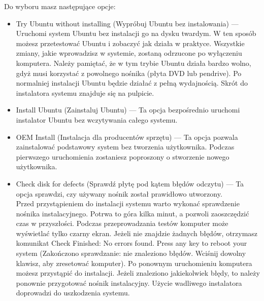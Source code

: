 \noindent Do wyboru masz następujące opcje:
\begin{itemize}
\item \textcolor{ubuntu_orange}{Try Ubuntu without installing (Wypróbuj Ubuntu bez instalowania)} --- Uruchomi system Ubuntu bez instalacji go na dysku twardym. W ten sposób możesz przetestować Ubuntu i zobaczyć jak działa w praktyce. Wszystkie zmiany, jakie wprowadzisz w systemie, zostaną odrzucone po wyłączeniu komputera. Należy pamiętać, że w tym trybie Ubuntu działa bardzo wolno, gdyż musi korzystać z powolnego nośnika (płyta DVD lub pendrive). Po normalniej instalacji Ubuntu będzie działać z pełną wydajnością. Skrót do instalatora systemu znajduje się na pulpicie.
\item \textcolor{ubuntu_orange}{Install Ubuntu (Zainstaluj Ubuntu)} --- Ta opcja bezpośrednio uruchomi instalator Ubuntu bez wczytywania całego systemu.
\item \textcolor{ubuntu_orange}{OEM Install (Instalacja dla producentów sprzętu)} --- Ta opcja pozwala zainstalować podstawowy system bez tworzenia użytkownika. Podczas pierwszego uruchomienia zostaniesz poproszony o stworzenie nowego użytkownika.
\item \textcolor{ubuntu_orange}{Check disk for defects (Sprawdź płytę pod kątem błędów odczytu)} --- Ta opcja sprawdzi, czy używany nośnik został prawidłowo utworzony.\\
Przed przystąpieniem do instalacji systemu warto wykonać sprawdzenie nośnika instalacyjnego. Potrwa to góra kilka minut, a pozwoli zaoszczędzić czas w przyszłości. Podczas przeprowadzania testów komputer może wyświetlać tylko czarny ekran. Jeżeli nie znajdzie żadnych błędów, otrzymasz komunikat \textcolor{ubuntu_orange}{Check Finished: No errors found. Press any key to reboot your system (Zakończono sprawdzanie: nie znaleziono błędów. Wciśnij dowolny klawisz, aby zresetować komputer)}. Po ponownym uruchomieniu komputera możesz przystąpić do instalacji. Jeżeli znaleziono jakiekolwiek błędy, to należy ponownie przygotować nośnik instalacyjny. Użycie wadliwego instalatora doprowadzi do uszkodzenia systemu. 
\end{itemize}
\clearpage
